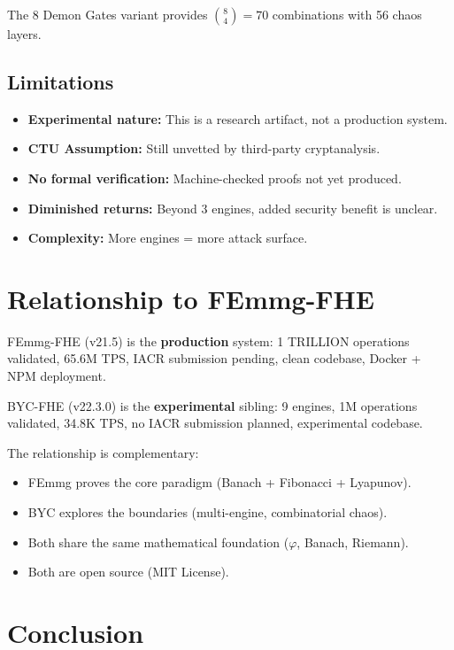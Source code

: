 \documentclass[11pt,a4paper]{article}
\begin{document}
The 8 Demon Gates variant provides $\binom{8}{4} = 70$ combinations with 56 chaos layers.

\subsection{Limitations}

\begin{itemize}
\item \textbf{Experimental nature:} This is a research artifact, not a production system.
\item \textbf{CTU Assumption:} Still unvetted by third-party cryptanalysis.
\item \textbf{No formal verification:} Machine-checked proofs not yet produced.
\item \textbf{Diminished returns:} Beyond 3 engines, added security benefit is unclear.
\item \textbf{Complexity:} More engines = more attack surface.
\end{itemize}

\section{Relationship to FEmmg-FHE}

FEmmg-FHE (v21.5) is the \textbf{production} system: 1 TRILLION operations validated, 65.6M TPS, IACR submission pending, clean codebase, Docker + NPM deployment.

BYC-FHE (v22.3.0) is the \textbf{experimental} sibling: 9 engines, 1M operations validated, 34.8K TPS, no IACR submission planned, experimental codebase.

The relationship is complementary:
\begin{itemize}
\item FEmmg proves the core paradigm (Banach + Fibonacci + Lyapunov).
\item BYC explores the boundaries (multi-engine, combinatorial chaos).
\item Both share the same mathematical foundation ($\varphi$, Banach, Riemann).
\item Both are open source (MIT License).
\end{itemize}

\section{Conclusion}
\end{document}
